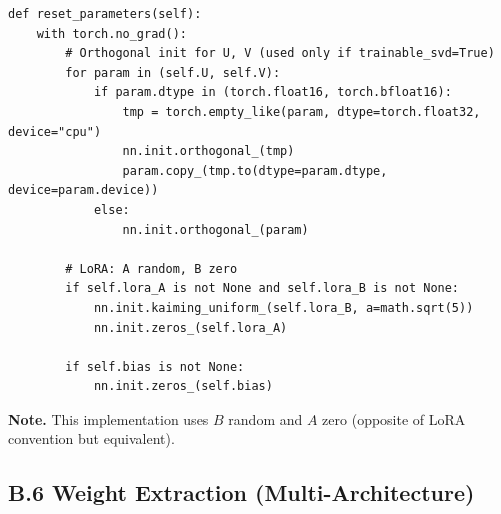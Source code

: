 \begin{lstlisting}
def reset_parameters(self):
    with torch.no_grad():
        # Orthogonal init for U, V (used only if trainable_svd=True)
        for param in (self.U, self.V):
            if param.dtype in (torch.float16, torch.bfloat16):
                tmp = torch.empty_like(param, dtype=torch.float32, device="cpu")
                nn.init.orthogonal_(tmp)
                param.copy_(tmp.to(dtype=param.dtype, device=param.device))
            else:
                nn.init.orthogonal_(param)
        
        # LoRA: A random, B zero
        if self.lora_A is not None and self.lora_B is not None:
            nn.init.kaiming_uniform_(self.lora_B, a=math.sqrt(5))
            nn.init.zeros_(self.lora_A)
        
        if self.bias is not None:
            nn.init.zeros_(self.bias)
\end{lstlisting}

\textbf{Note.} This implementation uses $B$ random and $A$ zero (opposite of LoRA 
convention but equivalent).

\subsection{B.6 Weight Extraction (Multi-Architecture)}

